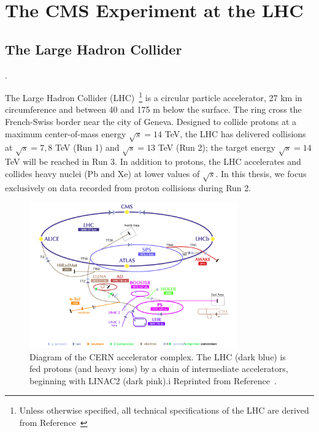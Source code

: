 \chapter{The CMS Experiment at the LHC}
\label{sec:cms}

\section{The Large Hadron Collider}
\label{sec:cms:lhc}.

The Large Hadron Collider (LHC)~\cite{lhcjinst}\footnote{Unless otherwise specified, all technical specifications of the LHC are derived from Reference~\cite{lhcjinst}} is a circular particle accelerator, 27 km in circumference and between 40 and 175 m below the surface. 
The ring cross the French-Swiss border near the city of Geneva. 
Designed to collide protons at a maximum center-of-mass energy $\sqrt{s} = 14$ TeV, the LHC has delivered collisions at $\sqrt{s}=7,8$ TeV (Run 1) and $\sqrt{s} = 13$ TeV (Run 2); the target energy $\sqrt{s} = 14$ TeV will be reached in Run 3. 
In addition to protons, the LHC accelerates and collides heavy nuclei (Pb and Xe) at lower values of $\sqrt{s}$. 
In this thesis, we focus exclusively on data recorded from proton collisions during Run 2. 

\begin{figure}[]
    \begin{center}
        \includegraphics[width=0.8\textwidth]{figures/cms/lhc.png}
        \caption{Diagram of the CERN accelerator complex.
                 The LHC (dark blue) is fed protons (and heavy ions) by a chain of intermediate accelerators, beginning with LINAC2 (dark pink).i
                 Reprinted from Reference~\cite{lhcpic}. 
                    }
        \label{fig:cms:lhc}
    \end{center}
\end{figure}

